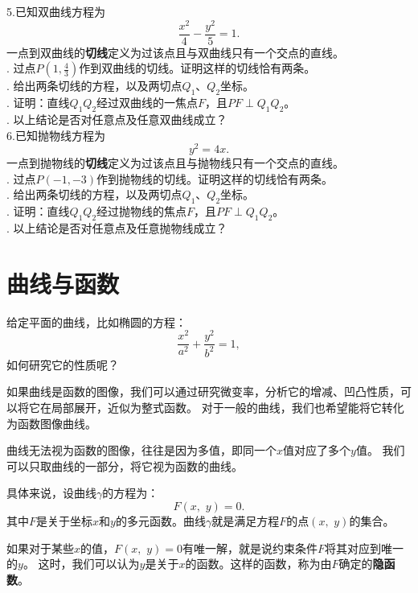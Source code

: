 \documentclass[12pt,UTF8]{ctexbook}
\begin{document}
\begin{xt}
    \indent 5.已知双曲线方程为
    $$ \frac{x^2}{4} - \frac{y^2}{5} = 1.$$ 
    一点到双曲线的\textbf{切线}定义为过该点且与双曲线只有一个交点的直线。\\
    . 过点$P\left(1, \frac{4}{3}\right)$作到双曲线的切线。证明这样的切线恰有两条。\\
    . 给出两条切线的方程，以及两切点$Q_1$、$Q_2$坐标。\\
    . 证明：直线$Q_1Q_2$经过双曲线的一焦点$F$，且$PF\perp Q_1Q_2$。\\
    . 以上结论是否对任意点及任意双曲线成立？\\
    \indent 6.已知抛物线方程为
    $$ y^2 = 4x.$$ 
    一点到抛物线的\textbf{切线}定义为过该点且与抛物线只有一个交点的直线。\\
    . 过点$P(-1, -3)$作到抛物线的切线。证明这样的切线恰有两条。\\
    . 给出两条切线的方程，以及两切点$Q_1$、$Q_2$坐标。\\
    . 证明：直线$Q_1Q_2$经过抛物线的焦点$F$，且$PF\perp Q_1Q_2$。\\
    . 以上结论是否对任意点及任意抛物线成立？\\
    
\end{xt}

\section{曲线与函数}

给定平面的曲线，比如椭圆的方程：
$$ \frac{x^2}{a^2} + \frac{y^2}{b^2} = 1,$$
如何研究它的性质呢？

如果曲线是函数的图像，我们可以通过研究微变率，分析它的增减、凹凸性质，可以将它在局部展开，近似为整式函数。
对于一般的曲线，我们也希望能将它转化为函数图像曲线。

曲线无法视为函数的图像，往往是因为多值，即同一个$x$值对应了多个$y$值。
我们可以只取曲线的一部分，将它视为函数的曲线。

具体来说，设曲线$\gamma$的方程为：
$$ F(x, \,\, y) = 0. $$
其中$F$是关于坐标$x$和$y$的多元函数。曲线$\gamma$就是满足方程$F$的点$(x,\,\,y)$的集合。

如果对于某些$x$的值，$F(x, \,\,y) = 0$有唯一解，就是说约束条件$F$将其对应到唯一的$y$。
这时，我们可以认为$y$是关于$x$的函数。这样的函数，称为由$F$确定的\textbf{隐函数}。
\end{document}

